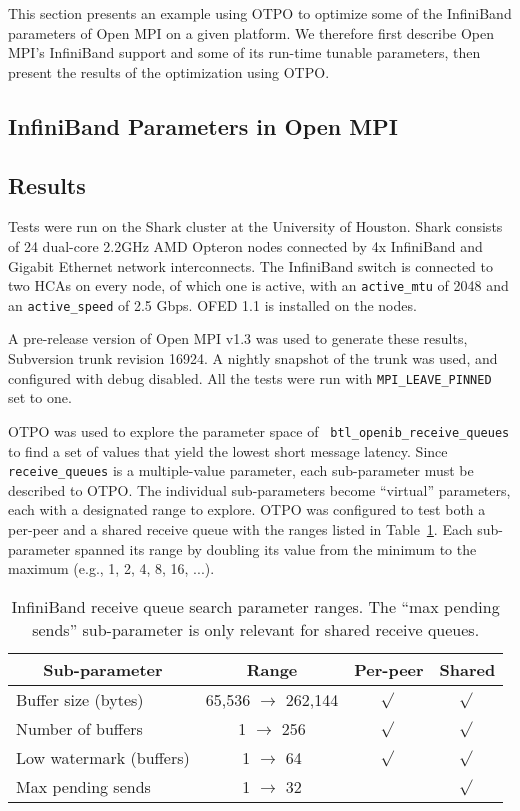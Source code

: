 This section presents an example using OTPO to optimize some of the
InfiniBand parameters of Open MPI on a given platform.  We therefore
first describe Open MPI's InfiniBand support and some of its run-time
tunable parameters, then present the results of the optimization using
OTPO.

\subsection{InfiniBand Parameters in Open MPI}



\subsection{Results}

Tests were run on the Shark cluster at the University of Houston.
Shark consists of 24 dual-core 2.2GHz AMD Opteron nodes connected by
4x InfiniBand and Gigabit Ethernet network interconnects.  
The InfiniBand switch is connected to two HCAs on every node, of which one is
active, with an {\tt active\_mtu} of 2048 and an {\tt active\_speed} of 2.5
Gbps. OFED 1.1 is installed on the nodes. 

A pre-release version of Open MPI v1.3 was used to generate these
results, Subversion trunk revision 16924. A nightly snapshot of the trunk was
used, and configured with debug disabled. All the tests were run with
{\tt MPI\_LEAVE\_PINNED} set to one.

OTPO was used to explore the parameter space of {\tt
  btl\_\-openib\_\-receive\_\-queues} to find a set of values that
yield the lowest short message latency.  Since {\tt receive\_\-queues}
is a multiple-value parameter, each sub-parameter must be described to
OTPO.  The individual sub-parameters become ``virtual'' parameters,
each with a designated range to explore.  OTPO was configured to test
both a per-peer and a shared receive queue with the ranges listed in
Table~\ref{table:eval-queue-search-params}.  Each sub-parameter
spanned its range by doubling its value from the minimum to the
maximum (e.g., 1, 2, 4, 8, 16, ...).

\def\yes{$\sqrt{}$}

\begin{table}[tb]
\centering
\caption{InfiniBand receive queue search parameter ranges.  The ``max
  pending sends'' sub-parameter is only relevant for shared receive
  queues.}
\label{table:eval-queue-search-params} 
\begin{tabular}{|l|c|c|c|} 
\multicolumn{1}{c}{Sub-parameter} &
\multicolumn{1}{c}{Range} &
\multicolumn{1}{c}{Per-peer} &
\multicolumn{1}{c}{Shared} \\
\hline
Buffer size (bytes) & 65,536 $\rightarrow$ 262,144 & \yes & \yes \\
Number of buffers & 1 $\rightarrow$ 256 & \yes & \yes \\
Low watermark (buffers) & 1 $\rightarrow$ 64  & \yes & \yes \\
Max pending sends & 1 $\rightarrow$ 32 & & \yes \\
\hline
\end{tabular}
\end{table}

